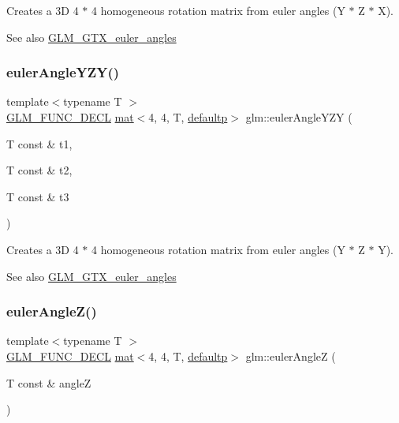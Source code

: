 Creates a 3D 4 $\ast$ 4 homogeneous rotation matrix from euler angles (Y $\ast$ Z $\ast$ X). \begin{DoxySeeAlso}{See also}
\mbox{\hyperlink{group__gtx__euler__angles}{G\+L\+M\+\_\+\+G\+T\+X\+\_\+euler\+\_\+angles}} 
\end{DoxySeeAlso}
\mbox{\label{group__gtx__euler__angles_ga5e5e40abc27630749b42b3327c76d6e4}} 
\subsubsection{\texorpdfstring{euler\+Angle\+Y\+Z\+Y()}{eulerAngleYZY()}}
{\footnotesize\ttfamily template$<$typename T $>$ \\
\mbox{\hyperlink{setup_8hpp_ab2d052de21a70539923e9bcbf6e83a51}{G\+L\+M\+\_\+\+F\+U\+N\+C\+\_\+\+D\+E\+CL}} \mbox{\hyperlink{structglm_1_1mat}{mat}}$<$4, 4, T, \mbox{\hyperlink{namespaceglm_a36ed105b07c7746804d7fdc7cc90ff25a9d21ccd8b5a009ec7eb7677befc3bf51}{defaultp}}$>$ glm\+::euler\+Angle\+Y\+ZY (\begin{DoxyParamCaption}\item[{T const \&}]{t1,  }\item[{T const \&}]{t2,  }\item[{T const \&}]{t3 }\end{DoxyParamCaption})}

Creates a 3D 4 $\ast$ 4 homogeneous rotation matrix from euler angles (Y $\ast$ Z $\ast$ Y). \begin{DoxySeeAlso}{See also}
\mbox{\hyperlink{group__gtx__euler__angles}{G\+L\+M\+\_\+\+G\+T\+X\+\_\+euler\+\_\+angles}} 
\end{DoxySeeAlso}
\mbox{\label{group__gtx__euler__angles_ga5b3935248bb6c3ec6b0d9297d406e251}} 
\subsubsection{\texorpdfstring{euler\+Angle\+Z()}{eulerAngleZ()}}
{\footnotesize\ttfamily template$<$typename T $>$ \\
\mbox{\hyperlink{setup_8hpp_ab2d052de21a70539923e9bcbf6e83a51}{G\+L\+M\+\_\+\+F\+U\+N\+C\+\_\+\+D\+E\+CL}} \mbox{\hyperlink{structglm_1_1mat}{mat}}$<$4, 4, T, \mbox{\hyperlink{namespaceglm_a36ed105b07c7746804d7fdc7cc90ff25a9d21ccd8b5a009ec7eb7677befc3bf51}{defaultp}}$>$ glm\+::euler\+AngleZ (\begin{DoxyParamCaption}\item[{T const \&}]{angleZ }\end{DoxyParamCaption})}

